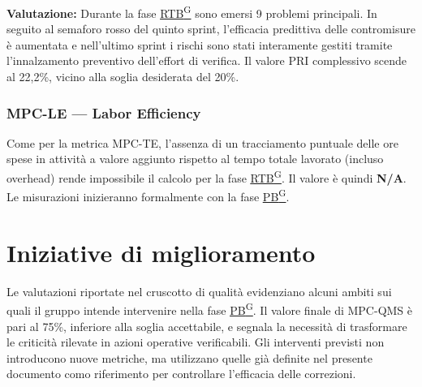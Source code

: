\documentclass[a4paper,12pt]{article}
\providecommand{\glslink}[2]{\href{https://alittlebyte-19.github.io/Documentazione/glossario.html\#gls-#1}{\underline{#2}\textsuperscript{\scriptsize G}}}
\begin{document}
\noindent\textbf{Valutazione:} Durante la fase \glslink{rtb-requirements-and-technology-baseline}{RTB} sono emersi 9 problemi principali. In seguito al semaforo rosso del quinto sprint, l'efficacia predittiva delle contromisure è aumentata e nell'ultimo sprint i rischi sono stati interamente gestiti tramite l'innalzamento preventivo dell'effort di verifica. Il valore PRI complessivo scende al 22,2\%, vicino alla soglia desiderata del 20\%.

\subsubsection{MPC-LE — Labor Efficiency}

Come per la metrica MPC-TE, l'assenza di un tracciamento puntuale delle ore spese in attività a valore aggiunto rispetto al tempo totale lavorato (incluso overhead) rende impossibile il calcolo per la fase \glslink{rtb-requirements-and-technology-baseline}{RTB}. Il valore è quindi \textbf{N/A}. Le misurazioni inizieranno formalmente con la fase \glslink{pb-product-baseline}{PB}.

\section{Iniziative di miglioramento}

Le valutazioni riportate nel cruscotto di qualità evidenziano alcuni ambiti sui quali il gruppo intende intervenire nella fase \glslink{pb-product-baseline}{PB}. Il valore finale di MPC-QMS è pari al 75\%, inferiore alla soglia accettabile, e segnala la necessità di trasformare le criticità rilevate in azioni operative verificabili. Gli interventi previsti non introducono nuove metriche, ma utilizzano quelle già definite nel presente documento como riferimento per controllare l'efficacia delle correzioni.
\end{document}
